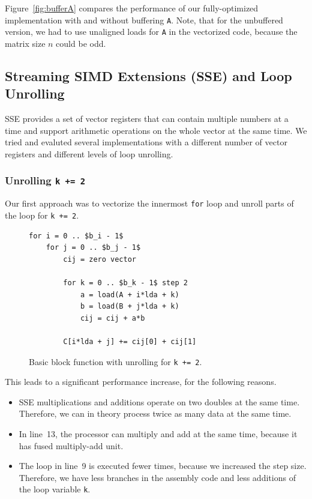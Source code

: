 \documentclass[12pt]{article}
\begin{document}
Figure~\ref{fig:bufferA} compares the performance of our fully-optimized implementation with and without buffering \lstinline{A}. Note, that for the unbuffered version, we had to use unaligned loads for \lstinline{A} in the vectorized code, because the matrix size $n$ could be odd.

\subsection{Streaming SIMD Extensions (SSE) and Loop Unrolling}
SSE provides a set of vector registers that can contain multiple numbers at a time and support arithmetic operations on the whole vector at the same time. We tried and evaluted several implementations with a different number of vector registers and different levels of loop unrolling.

\subsubsection{Unrolling \lstinline{k += 2}}
Our first approach was to vectorize the innermost \lstinline{for} loop and unroll parts of the loop for \lstinline{k += 2}.

\begin{figure}[H]
\begin{lstlisting}[mathescape]
for i = 0 .. $b_i - 1$
	for j = 0 .. $b_j - 1$
		cij = zero vector

		for k = 0 .. $b_k - 1$ step 2
			a = load(A + i*lda + k)
			b = load(B + j*lda + k)
			cij = cij + a*b

		C[i*lda + j] += cij[0] + cij[1]
\end{lstlisting}
\caption{Basic block function with unrolling for \lstinline{k += 2}.}
\label{fig:basic_sse}
\end{figure}

This leads to a significant performance increase, for the following reasons.
\begin{itemize}
	\item SSE multiplications and additions operate on two doubles at the same time. Therefore, we can in theory process twice as many data at the same time.
	\item In line~13, the processor can multiply and add at the same time, because it has fused multiply-add unit.
	\item The loop in line~9 is executed fewer times, because we increased the step size. Therefore, we have less branches in the assembly code and less additions of the loop variable \lstinline{k}.
\end{itemize}
\end{document}
